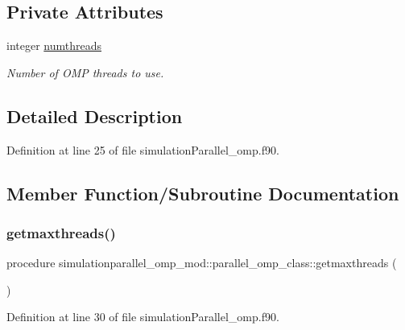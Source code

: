 \subsection*{Private Attributes}
\begin{DoxyCompactItemize}
\item 
integer \mbox{\hyperlink{structsimulationparallel__omp__mod_1_1parallel__omp__class_ae0b69bf0f8a4f8df97fccf569ba20ff9}{numthreads}}
\begin{DoxyCompactList}\small\item\em Number of O\+MP threads to use. \end{DoxyCompactList}\end{DoxyCompactItemize}


\subsection{Detailed Description}


Definition at line 25 of file simulation\+Parallel\+\_\+omp.\+f90.



\subsection{Member Function/\+Subroutine Documentation}
\mbox{\label{structsimulationparallel__omp__mod_1_1parallel__omp__class_aea4b7dd8b8106cf1a92323dfc5a28d3d}} 
\subsubsection{\texorpdfstring{getmaxthreads()}{getmaxthreads()}}
{\footnotesize\ttfamily procedure simulationparallel\+\_\+omp\+\_\+mod\+::parallel\+\_\+omp\+\_\+class\+::getmaxthreads (\begin{DoxyParamCaption}{ }\end{DoxyParamCaption})\hspace{0.3cm}{\ttfamily [private]}}



Definition at line 30 of file simulation\+Parallel\+\_\+omp.\+f90.

